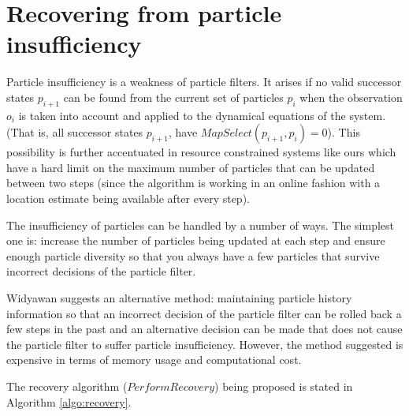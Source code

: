 \documentclass[10pt,journal,letterpaper,compsoc]{IEEEtran}
\begin{document}
\section{Recovering from particle insufficiency}

Particle insufficiency is a weakness of particle filters. It arises if 
no valid successor states $p_{i+1}$ can be found from the current set of 
particles $p_i$ when the observation $o_i$ is taken into account and applied 
to the dynamical equations of the system. (That is, all successor states 
$p_{i+1}$, have $MapSelect(p_{i+1}, p_i) = 0$). This possibility is 
further accentuated in resource constrained systems like ours which 
have a hard limit on the maximum number of particles that can be 
updated between two steps (since the algorithm is working in an online
fashion with a location estimate being available after every step).

The insufficiency of particles can be handled by a number of ways. 
The simplest one is: increase the number of particles being updated at each 
step and ensure enough particle diversity so that you always have 
a few particles that survive incorrect decisions of the particle filter. 

Widyawan \cite{Widyawan} suggests an alternative method: maintaining particle
history information so that an incorrect decision of the particle filter can be
rolled back a few steps in the past and an alternative decision can be made that
does not cause the particle filter to suffer particle insufficiency. However,
the method suggested is expensive in terms of memory usage and computational
cost.

The recovery algorithm ($PerformRecovery$) being proposed is stated in 
Algorithm \ref{algo:recovery}.
\end{document}
